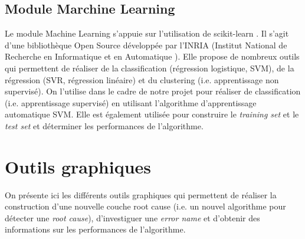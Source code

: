 \subsection{Module Marchine Learning}
\label{Industrialisation du produit:  API: Le module Machine Learning}
Le module Machine Learning s'appuie sur l'utilisation de scikit-learn \cite{ScikitLearn}. Il s'agit d'une bibliothèque Open Source développée par l'INRIA (Institut National de Recherche en Informatique et en Automatique \cite{INRIA}). Elle propose de nombreux outils qui permettent de réaliser de la classification (régression logistique, SVM), de la régression (SVR, régression linéaire) et du clustering (i.e. apprentissage non supervisé). On l'utilise dans le cadre de notre projet pour réaliser de classification (i.e. apprentissage supervisé) en utilisant l'algorithme d'apprentissage automatique SVM. Elle est également utilisée pour construire le \emph{training set} et le \emph{test set} et déterminer les performances de l'algorithme.

\section{Outils graphiques}
\label{Industrialisation du produit: Outils graphiques}
On présente ici les différents outils graphiques qui permettent de réaliser la construction d'une nouvelle couche root cause (i.e. un nouvel algorithme pour détecter une \emph{root cause}), d'investiguer une \emph{error name} et d'obtenir des informations sur les performances de l'algorithme. 

